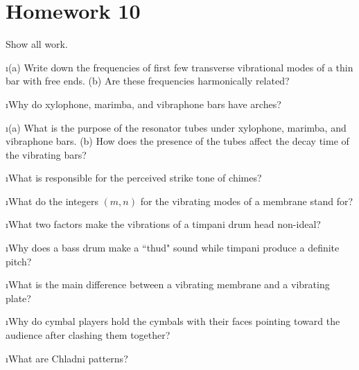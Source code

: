 \section{Homework 10}

\noindent
Show all work.

\ben

\i (a) Write down the frequencies of first few transverse 
vibrational modes of a thin bar with free ends.
(b) Are these frequencies harmonically related?

\i Why do xylophone, marimba, and vibraphone bars have arches?

\i (a) What is the purpose of the resonator tubes under xylophone,
marimba, and vibraphone bars.
(b) How does the presence of the tubes affect the decay time 
of the vibrating bars?

\i What is responsible for the perceived strike tone of chimes?

\i What do the integers $(m,n)$ for the vibrating modes of a
membrane stand for?

\i What two factors make the vibrations of a timpani drum head
non-ideal?

\i Why does a bass drum make a ``thud" sound while timpani produce
a definite pitch?

\i What is the main difference between a vibrating membrane and
a vibrating plate?

\i Why do cymbal players hold the cymbals with their faces pointing
toward the audience after clashing them together?

\i What are Chladni patterns?

\een

